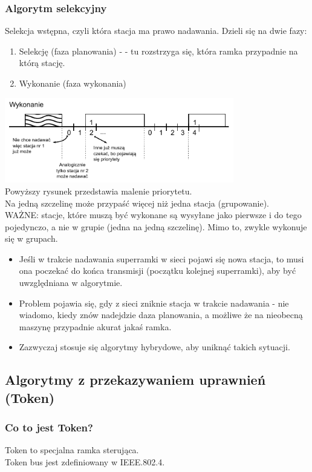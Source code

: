 			\subsubsection{Algorytm selekcyjny}
				Selekcja wstępna, czyli która stacja ma prawo nadawania. Dzieli się na dwie fazy:
				\begin{enumerate}
					\item Selekcję (faza planowania) - - tu rozstrzyga się, która ramka przypadnie na którą stację.
					\item Wykonanie (faza wykonania)
				\end{enumerate}
				\includegraphics[width=10cm]{./images/image26.pdf}\\
				Powyższy rysunek przedstawia malenie priorytetu.\\
				Na jedną szczelinę może przypaść więcej niż jedna stacja (grupowanie).\\
				WAŻNE: stacje, które muszą być wykonane są wysyłane jako pierwsze i do tego pojedynczo, a nie w grupie (jedna na jedną szczelinę). Mimo to, zwykle wykonuje się w grupach.
				\begin{itemize}
					\item  Jeśli w trakcie nadawania superramki w sieci pojawi się nowa stacja, to musi ona poczekać do końca transmisji (początku kolejnej superramki), aby być uwzględniana w algorytmie.
					\item Problem pojawia się, gdy z sieci zniknie stacja w trakcie nadawania - nie wiadomo, kiedy znów nadejdzie daza planowania, a możliwe że na nieobecną maszynę przypadnie akurat jakaś ramka.
					\item Zazwyczaj stosuje się algorytmy hybrydowe, aby uniknąć takich sytuacji.
				\end{itemize}
		\subsection{Algorytmy z przekazywaniem uprawnień (Token)}
			\subsubsection{Co to jest Token?}
				Token to specjalna ramka sterująca.\\
				Token bus jest zdefiniowany w IEEE.802.4.
